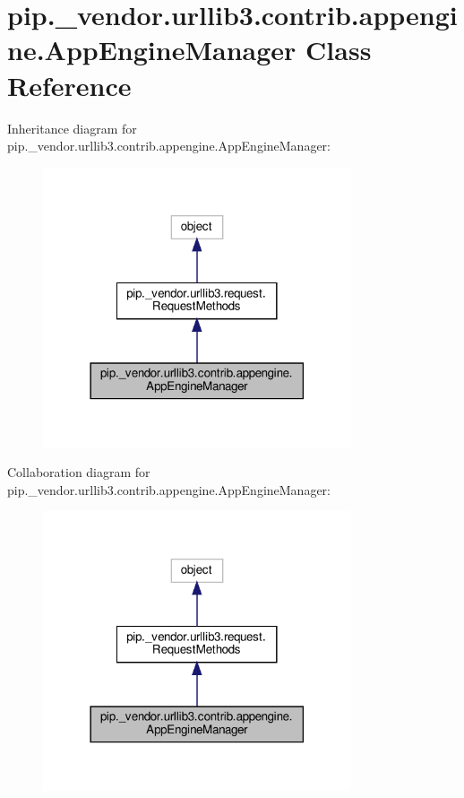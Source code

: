 \hypertarget{classpip_1_1__vendor_1_1urllib3_1_1contrib_1_1appengine_1_1AppEngineManager}{}\section{pip.\+\_\+vendor.\+urllib3.\+contrib.\+appengine.\+App\+Engine\+Manager Class Reference}
\label{classpip_1_1__vendor_1_1urllib3_1_1contrib_1_1appengine_1_1AppEngineManager}


Inheritance diagram for pip.\+\_\+vendor.\+urllib3.\+contrib.\+appengine.\+App\+Engine\+Manager\+:
\nopagebreak
\begin{figure}[H]
\begin{center}
\leavevmode
\includegraphics[width=258pt]{classpip_1_1__vendor_1_1urllib3_1_1contrib_1_1appengine_1_1AppEngineManager__inherit__graph}
\end{center}
\end{figure}


Collaboration diagram for pip.\+\_\+vendor.\+urllib3.\+contrib.\+appengine.\+App\+Engine\+Manager\+:
\nopagebreak
\begin{figure}[H]
\begin{center}
\leavevmode
\includegraphics[width=258pt]{classpip_1_1__vendor_1_1urllib3_1_1contrib_1_1appengine_1_1AppEngineManager__coll__graph}
\end{center}
\end{figure}
